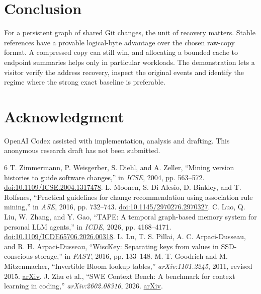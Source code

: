 \documentclass[conference]{IEEEtran}
\begin{document}
\section{Conclusion}
For a persistent graph of shared Git changes, the unit of recovery matters. Stable references have a provable logical-byte advantage over the chosen raw-copy format. A compressed copy can still win, and allocating a bounded cache to endpoint summaries helps only in particular workloads. The demonstration lets a visitor verify the address recovery, inspect the original events and identify the regime where the strong exact baseline is preferable.

\section*{Acknowledgment}
OpenAI Codex assisted with implementation, analysis and drafting. This anonymous research draft has not been submitted.

\begin{thebibliography}{6}
 T. Zimmermann, P. Weisgerber, S. Diehl, and A. Zeller, “Mining version histories to guide software changes,” in \emph{ICSE}, 2004, pp. 563--572. \href{https://doi.org/10.1109/ICSE.2004.1317478}{doi:10.1109/ICSE.2004.1317478}.
 L. Moonen, S. Di Alesio, D. Binkley, and T. Rolfsnes, “Practical guidelines for change recommendation using association rule mining,” in \emph{ASE}, 2016, pp. 732--743. \href{https://doi.org/10.1145/2970276.2970327}{doi:10.1145/2970276.2970327}.
 C. Luo, Q. Liu, W. Zhang, and Y. Gao, “TAPE: A temporal graph-based memory system for personal LLM agents,” in \emph{ICDE}, 2026, pp. 4168--4171. \href{https://doi.org/10.1109/ICDE65706.2026.00318}{doi:10.1109/ICDE65706.2026.00318}.
 L. Lu, T. S. Pillai, A. C. Arpaci-Dusseau, and R. H. Arpaci-Dusseau, “WiscKey: Separating keys from values in SSD-conscious storage,” in \emph{FAST}, 2016, pp. 133--148.
 M. T. Goodrich and M. Mitzenmacher, “Invertible Bloom lookup tables,” \emph{arXiv:1101.2245}, 2011, revised 2015. \href{https://arxiv.org/abs/1101.2245}{arXiv}.
 J. Zhu et al., “SWE Context Bench: A benchmark for context learning in coding,” \emph{arXiv:2602.08316}, 2026. \href{https://arxiv.org/abs/2602.08316}{arXiv}.
\end{thebibliography}
\end{document}
